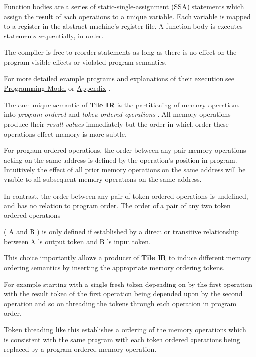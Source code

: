 \documentclass{article}
\begin{document}
Function bodies are a series of static-single-assignment (SSA) statements which assign the result of each operations to a unique variable. Each variable is mapped to a register in the abstract machine's register file. A function body is executes statements sequentially, in order.

The compiler is free to reorder statements as long as there is no effect on the program visible effects or violated program semantics.


For more detailed example programs and explanations of their execution see \href{https://docs.nvidia.com/cuda/tile-ir/latest/sections/prog_model.html#section-prog-model}{Programming Model} or \href{https://docs.nvidia.com/cuda/tile-ir/latest/sections/appendix.html#section-appendix}{Appendix} .


The one unique semantic of \textbf{Tile IR} is the partitioning of memory operations into \textit{program ordered} and \textit{token ordered operations} . All memory operations produce their \textit{result values} immediately but the order in which order these operations effect memory is more subtle.


For program ordered operations, the order between any pair memory operations acting on the same address is defined by the operation's position in program. Intuitively the effect of all prior memory operations on the same address will be visible to all subsequent memory operations on the same address.


In contrast, the order between any pair of token ordered operations is undefined, and has no relation to program order. The order of a pair of any two token ordered operations

( A and B ) is only defined if established by a direct or transitive relationship between A 's output token and B 's input token.


This choice importantly allows a producer of \textbf{Tile IR} to induce different memory ordering semantics by inserting the appropriate memory ordering tokens.


For example starting with a single fresh token depending on by the first operation with the result token of the first operation being depended upon by the second operation and so on threading the tokens through each operation in program order.


Token threading like this establishes a ordering of the memory operations which is consistent with the same program with each token ordered operations being replaced by a program ordered memory operation.
\end{document}
